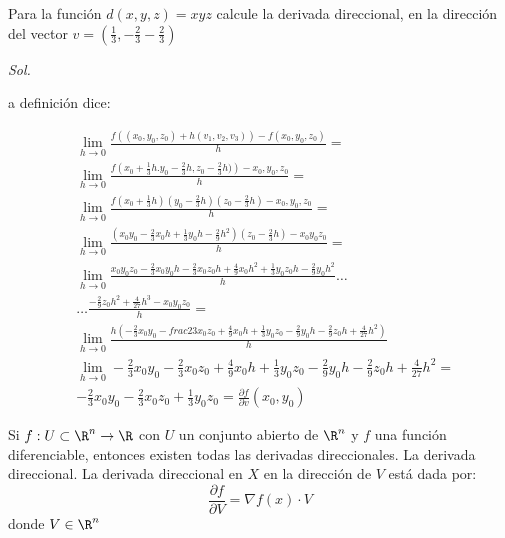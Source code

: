 \begin{example}
	Para la función $d(x,y,z)=xyz$ calcule la derivada direccional, en la dirección del vector $v=\left(\frac{1}{3},-\frac{2}{3}-\frac{2}{3}\right)$
\end{example}

\textit{ Sol. }

a definición dice:

\begin{align*}
	 & \lim_{h\to 0}\frac{f\left((x_0,y_0,z_0)+h(v_1,v_2,v_3)\right)-f\left(x_0,y_0,z_0\right)}{h}=                                                               \\
	 & \lim_{h\to 0}\frac{f\left(x_0+\frac{1}{3}h.y_0-\frac{2}{3}h,z_0-\frac{2}{3}h)\right)-x_0,y_0,z_0}{h}=                                                      \\
	 & \lim_{h\to 0}\frac{f\left(x_0+\frac{1}{3}h\right)\left(y_0-\frac{2}{3}h\right)\left(z_0-\frac{2}{3}h\right)-x_0,y_0,z_0}{h}=                               \\
	 & \lim_{h\to 0}\frac{\left(x_0y_0-\frac{2}{3}x_0h+\frac{1}{3}y_0h-\frac{2}{9}h^2\right)\left(z_0-\frac{2}{3}h\right)-x_0y_0z_0}{h}=                          \\
	 & \lim_{h\to 0}\frac{x_0y_0z_0-\frac{2}{3}x_0y_0h-\frac{2}{3}x_0z_0h+\frac{4}{9}x_0h^2+\frac{1}{3}y_0z_0h-\frac{2}{9}y_0h^2}{h}\dots                         \\
	 & \dots \frac{-\frac{2}{9}z_0h^2+\frac{4}{27}h^3-x_0y_0z_0}{h}=                                                                                              \\
	 & \lim_{h\to 0}\frac{h\left(-\frac{2}{3}x_0y_0-frac{2}{3}x_0z_0+\frac{4}{9}x_0h+\frac{1}{3}y_0z_0-\frac{2}{9}y_0h-\frac{2}{9}z_0h+\frac{4}{27}h^2\right)}{h} \\
	 & \lim_{h\to 0}-\frac{2}{3}x_0y_0-\frac{2}{3}x_0z_0+\frac{4}{9}x_0h+\frac{1}{3}y_0z_0-\frac{2}{9}y_0h-\frac{2}{9}z_0h+\frac{4}{27}h^2=                       \\
	 & -\frac{2}{3}x_0y_0-\frac{2}{3}x_0z_0+\frac{1}{3}y_0z_0=\frac{\partial f}{\partial v}\left(x_0,y_0\right)
\end{align*}

\begin{theorem}[a]
	Si $f:U\subset \R^n\to \R$ con $U$ un conjunto abierto de $\R^n$ y $f$ una función diferenciable, entonces existen todas las derivadas direccionales. La derivada direccional. La derivada direccional en $X$ en la dirección de $V$ está dada por:
	\begin{equation}
		\frac{\partial f}{\partial V}=\nabla f(x)\cdot V
	\end{equation}
	donde $V\in \R^n$
\end{theorem}

